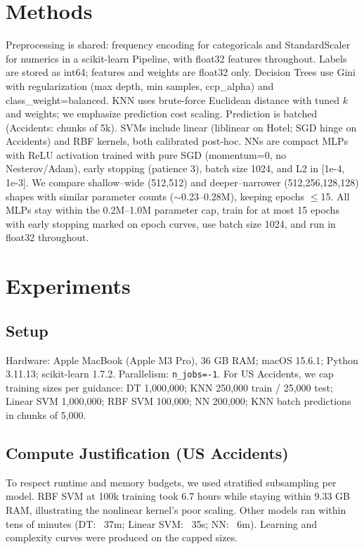 \documentclass[conference]{IEEEtran}
\newcommand{\datasetB}{US Accidents}
\begin{document}
\section{Methods}
Preprocessing is shared: frequency encoding for categoricals and StandardScaler for numerics in a scikit-learn Pipeline, with float32 features throughout. Labels are stored as int64; features and weights are float32 only. Decision Trees use Gini with regularization (max depth, min samples, ccp\_alpha) and class\_weight=balanced. KNN uses brute-force Euclidean distance with tuned $k$ and weights; we emphasize prediction cost scaling. Prediction is batched (Accidents: chunks of 5k). SVMs include linear (liblinear on Hotel; SGD hinge on Accidents) and RBF kernels, both calibrated post-hoc. NNs are compact MLPs with ReLU activation trained with pure SGD (momentum=0, no Nesterov/Adam), early stopping (patience 3), batch size 1024, and L2 in [1e-4, 1e-3]. We compare shallow–wide (512,512) and deeper–narrower (512,256,128,128) shapes with similar parameter counts ($\sim$0.23–0.28M), keeping epochs $\leq$15. All MLPs stay within the 0.2M–1.0M parameter cap, train for at most 15 epochs with early stopping marked on epoch curves, use batch size 1024, and run in float32 throughout.

\section{Experiments}
\subsection{Setup}
Hardware: Apple MacBook (Apple M3 Pro), 36 GB RAM; macOS 15.6.1; Python 3.11.13; scikit-learn 1.7.2. Parallelism: \texttt{n\_jobs=-1}. For \datasetB{}, we cap training sizes per guidance: DT 1{,}000{,}000; KNN 250{,}000 train / 25{,}000 test; Linear SVM 1{,}000{,}000; RBF SVM 100{,}000; NN 200{,}000; KNN batch predictions in chunks of 5{,}000.

\subsection{Compute Justification (\datasetB)}
To respect runtime and memory budgets, we used stratified subsampling per model. RBF SVM at 100k training took 6.7 hours while staying within 9.33 GB RAM, illustrating the nonlinear kernel's poor scaling. Other models ran within tens of minutes (DT: ~37m; Linear SVM: ~35s; NN: ~6m). Learning and complexity curves were produced on the capped sizes.
\end{document}
